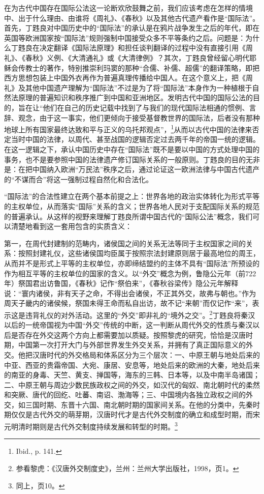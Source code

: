 \documentclass[a4paper, 12pt, openright]{ctexbook}
\begin{document}
在为古代中国存在国际公法这一论断欢欣鼓舞之前，我们应该考虑在怎样的情境中、出于什么理由、由谁将《周礼》、《春秋》以及其他古代遗产看作是“国际法”。首先，丁韪良对中国历史中的“国际法”的承认是在鸦片战争发生之后的年代，即在英国等欧洲国家按“国际法”规则强制中国接受众多不平等条约之后。问题是：为什么丁韪良在决定翻译《国际法原理》和担任谈判翻译的过程中没有直接引用《周礼》、《春秋》义例、《大清通礼》或《大清律例》？其次，丁韪良曾经留心明代耶稣会传教士的著作，特别推崇利玛窦的那种“合儒、补儒、超儒”的翻译策略，即把西方思想包装上中国外衣再作为普遍真理传播给中国人。在这个意义上，把《周礼》及其他中国遗产理解为“国际法”不过是为了将“国际法”本身作为一种植根于自然法原理的普遍知识和秩序推广到中国和亚洲地区。发明古代中国的国际公法的目的，旨在让“他们在自己的历史记载中找到了与我们的现代国际法相通的惯例、言辞、观念，由于这一事实，他们更倾向于接受基督教世界的国际法，后者没有那种地球上所有国家最终达致和平与正义的乌托邦观点”，\footnote{Ibid., p. 141.}从而以古代中国的法律来否定当时中国的法律，以周代、甚至战国的逻辑否定过去两千年的帝国一统的逻辑。在这一逻辑之下，承认中国历史中存在“国际法”既不是要以中国的方式处理中国的事务，也不是要参照中国的法律遗产修订国际关系的一般原则。丁韪良的目的无非是：在把中国纳入欧洲“万民法”秩序之后，通过论证这一欧洲法律与中国古代遗产的“不谋而合”将这一强制过程自然化和合法化。

“国际法”的合法性建立在两个基本前提之上：世界各地的政治实体转化为形式平等的主权单位，从而落实“国际”关系的含义；世界各地人民对于支配国际关系的规范的普遍承认。从这样的视野来理解丁韪良所谓中国古代的“国际公法”概念，我们可以清楚地看到这一套用包含的实质含义：

第一，在周代封建制的范畴内，诸侯国之间的关系无法等同于主权国家之间的关系：按照封建礼仪，这些诸侯国均臣属于按照宗法封建原则居于最高地位的周王，从而并不是形式上平等的主权单位，亦即缔结盟约的主体不具有“国际法”所预设的作为相互平等的主权单位的国家的含义。以“外交”概念为例，鲁隐公元年（前722年）祭国君出访鲁国，《春秋》记作“祭伯来”，《春秋谷梁传》隐公元年解释说：“寰内诸侯，非有天子之命，不得出会诸侯，不正其外交，故弗与朝也。”作为周天子畿内的诸侯候，祭国未得王命而私自出访，故不记“来朝”而仅记作“来”，表示这是违背礼仪的对外活动。这里的“外交”即非礼的“境外之交”。\footnote{参看黎虎：《汉唐外交制度史》，兰州：兰州大学出版社，1998，页1。}丁韪良将秦汉以后的一统帝国视为中国“外交”传统的中断，这一判断从周代外交的性质与秦汉以后是否存在外交这两个方向上都需要加以质疑。按照黎虎的研究，恰恰是汉唐时期，中国第一次打开大门与外部世界发生外交关系，并拥有了真正国际意义的外交。他把汉唐时代的外交格局和体系区分为三个层次：一、中原王朝与地处后来的中亚、西亚的贵霜帝国、大宛、康居、安息等，地处后来的欧洲的大秦，地处后来的南亚的身毒、天竺、黄支、掸国等，海东的三韩、日本等，以及中南半岛诸国；二、中原王朝与周边少数民族政权之间的外交，如汉代的匈奴、南北朝时代的柔然和突厥、唐代的回纥、吐蕃、南诏、渤海等；三、中国境内各独立政权之间的外交，如三国时期、东晋十六国、南北朝时期的国家间关系。在他的分类中，先秦时期仅仅是古代外交的萌芽期，汉唐时代才是古代外交制度的确立和成型时期，而宋元明清时期则是古代外交制度持续发展和转型的时期。\footnote{同上，页10。}
\end{document}

